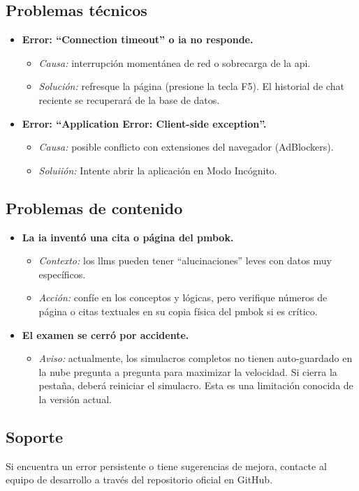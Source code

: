 \subsection{Problemas técnicos}
\begin{itemize}
\item \textbf{Error: \enquote{Connection timeout} o \gls{ia} no responde.}
\begin{itemize}
\item \textit{Causa:} interrupción momentánea de red o sobrecarga de la \gls{api}.
\item \textit{Solución:} refresque la página (presione la tecla F5). El historial de chat reciente se recuperará de la base de datos.
\end{itemize}
\item \textbf{Error: \enquote{Application Error: Client-side exception}.}
\begin{itemize}
\item \textit{Causa:} posible conflicto con extensiones del navegador (AdBlockers).
\item \textit{Soluiión:} Intente abrir la aplicación en Modo Incógnito.
\end{itemize}
\end{itemize}
\subsection{Problemas de contenido}
\begin{itemize}
\item \textbf{La \gls{ia} inventó una cita o página del \gls{pmbok}.}
\begin{itemize}
\item \textit{Contexto:} los \glspl{llm} pueden tener \enquote{alucinaciones} leves con datos muy específicos.
\item \textit{Acción:} confíe en los conceptos y lógicas, pero verifique números de página o citas textuales en su copia física del \gls{pmbok} si es crítico.
\end{itemize}
\item \textbf{El examen se cerró por accidente.}
\begin{itemize}
\item \textit{Aviso:} actualmente, los simulacros completos no tienen auto-guardado en la nube pregunta a pregunta para maximizar la velocidad. Si cierra la pestaña, deberá reiniciar el simulacro. Esta es una limitación conocida de la versión actual.
\end{itemize}
\end{itemize}
\subsection{Soporte}
Si encuentra un error persistente o tiene sugerencias de mejora, contacte al equipo de desarrollo a través del repositorio oficial en GitHub.